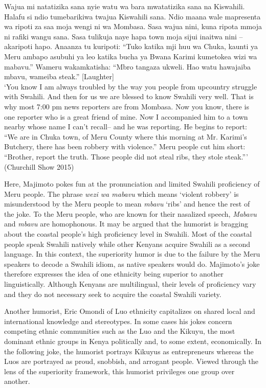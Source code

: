 \documentclass[output=paper]{langsci/langscibook}
\begin{document}
\ea
 Wajua mi natatizika sana nyie watu wa bara mwatatizika sana na Kiswahili. Halafu si ndio tumebarikiwa twajua Kiswahili sana. Ndio maana wale mapresenta wa ripoti za saa moja wengi ni wa Mombasa. Sasa wajua nini, kuna ripota mmoja ni rafiki wangu sana. Sasa tulikuja naye hapa town moja sijui inaitwa nini – akaripoti hapo. Anaanza tu kuripoti: “Tuko katika mji huu wa Chuka, kaunti ya Meru ambapo asubuhi ya leo katika bucha ya Bwana Karimi kumetokea wizi wa mabavu.” Wameru wakamkatisha: “Mbro tangaza ukweli. Hao watu hawajaiba mbavu, wameiba steak.” \textup{[Laughter]} \\
\glt ‘You know I am always troubled by the way you people from upcountry struggle with Swahili. And then for us we are blessed to know Swahili very well. That is why most 7:00 pm news reporters are from Mombasa. Now you know, there is one reporter who is a great friend of mine. Now I accompanied him to a town nearby whose name I can’t recall– and he was reporting. He begins to report: “We are in Chuka town, of Meru County where this morning at Mr. Karimi’s Butchery, there has been robbery with violence.” Meru people cut him short: “Brother, report the truth. Those people did not steal ribs, they stole steak.”’ (Churchill Show 2015)
\z

Here, Majimoto pokes fun at the pronunciation and limited Swahili proficiency of Meru people. The phrase \textit{wezi wa mabavu} which means ‘violent robbery’ is misunderstood by the Meru people to mean \textit{mbavu} ‘ribs’ and hence the rest of the joke. To the Meru people, who are known for their nasalized speech, \textit{Mabavu} and \textit{mbavu} are homophonous. It may be argued that the humorist is bragging about the coastal people’s high proficiency level in Swahili. Most of the coastal people speak Swahili natively while other Kenyans acquire Swahili as a second language. In this context, the superiority humor is due to the failure by the Meru speakers to decode a Swahili idiom, as native speakers would do. Majimoto’s joke therefore expresses the idea of one ethnicity being superior to another linguistically. Although Kenyans are multilingual, their levels of proficiency vary and they do not necessary seek to acquire the coastal Swahili variety.

Another humorist, Eric Omondi of Luo ethnicity capitalizes on shared local and international knowledge and stereotypes. In some cases his jokes concern competing ethnic communities such as the Luo and the Kikuyu, the most dominant ethnic groups in Kenya politically and, to some extent, economically. In the following joke, the humorist portrays Kikuyus as entrepreneurs whereas the Luos are portrayed as proud, snobbish, and arrogant people. Viewed through the lens of the superiority framework, this humorist privileges one group over another. 
 
\end{document}
